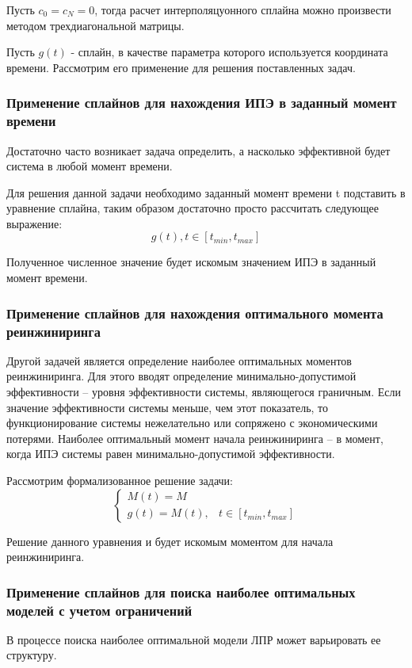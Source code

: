 Пусть $c_{0} = c_{N} = 0$, тогда расчет интерполяцуонного сплайна можно произвести методом трехдиагональной матрицы.

Пусть $g(t)$ - сплайн, в качестве параметра которого используется координата времени. Рассмотрим его применение для решения поставленных задач.

\subsubsection{Применение сплайнов для нахождения ИПЭ в заданный момент времени}
Достаточно часто возникает задача определить, а насколько эффективной будет система в любой момент времени. 

Для решения данной задачи необходимо заданный момент времени t подставить в уравнение сплайна, таким образом достаточно просто рассчитать следующее выражение:
\begin{equation}
    g(t), t \in [t_{min},t_{max}]
\end{equation}

Полученное численное значение будет искомым значением ИПЭ в заданный момент времени.

\subsubsection{Применение сплайнов для нахождения оптимального момента реинжиниринга}

Другой задачей является определение наиболее оптимальных моментов реинжиниринга.
Для этого вводят определение минимально-допустимой эффективности – уровня эффективности системы, являющегося граничным. 
Если значение эффективности системы меньше, чем этот показатель, то функционирование системы нежелательно или сопряжено с экономическими потерями. 
Наиболее оптимальный момент начала реинжиниринга – в момент, когда ИПЭ системы равен минимально-допустимой эффективности.

Рассмотрим формализованное решение задачи:\begin{equation}
    \begin{cases}
        M(t)=M  \\
        g(t)=M(t), & t \in [t_{min},t_{max}]
    \end{cases}
\end{equation}

Решение данного уравнения и будет искомым моментом для начала реинжиниринга.

\subsubsection{Применение сплайнов для поиска наиболее оптимальных моделей с учетом ограничений}
В процессе поиска наиболее оптимальной модели ЛПР может варьировать ее структуру.

